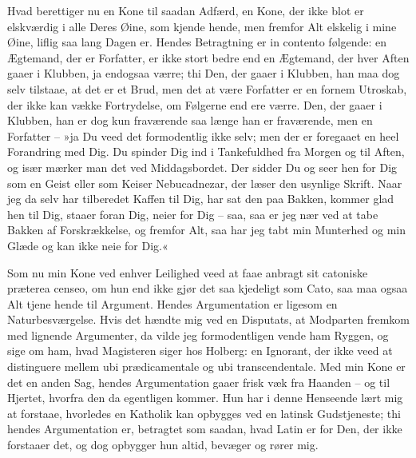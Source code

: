 \documentclass[12pt,a4paper]{article}
\begin{document}
Hvad berettiger nu en Kone til saadan Adfærd, en Kone, der ikke blot er elskværdig i alle Deres Øine, som kjende hende, men fremfor Alt elskelig i mine Øine, liflig saa lang Dagen er. Hendes Betragtning er in contento følgende: en Ægtemand, der er Forfatter, er ikke stort bedre end en Ægtemand, der hver Aften gaaer i Klubben, ja endogsaa værre; thi Den, der gaaer i Klubben, han maa dog selv tilstaae, at det er et Brud, men det at være Forfatter er en fornem Utroskab, der ikke kan vække Fortrydelse, om Følgerne end ere værre. Den, der gaaer i Klubben, han er dog kun fraværende saa længe han er fraværende, men en Forfatter – »ja Du veed det formodentlig ikke selv; men der er foregaaet en heel Forandring med Dig. Du spinder Dig ind i Tankefuldhed fra Morgen og til Aften, og især mærker man det ved Middagsbordet. Der sidder Du og seer hen for Dig som en Geist eller som Keiser Nebucadnezar, der læser den usynlige Skrift. Naar jeg da selv har tilberedet Kaffen til Dig, har sat den paa Bakken, kommer glad hen til Dig, staaer foran Dig, neier for Dig – saa, saa er jeg nær ved at tabe Bakken af Forskrækkelse, og fremfor Alt, saa har jeg tabt min Munterhed og min Glæde og kan ikke neie for Dig.«

Som nu min Kone ved enhver Leilighed veed at faae anbragt sit catoniske præterea censeo, om hun end ikke gjør det saa kjedeligt som Cato, saa maa ogsaa Alt tjene hende til Argument. Hendes Argumentation er ligesom en Naturbesværgelse. Hvis det hændte mig ved en Disputats, at Modparten fremkom med lignende Argumenter, da vilde jeg formodentligen vende ham Ryggen, og sige om ham, hvad Magisteren siger hos Holberg: en Ignorant, der ikke veed at distinguere mellem ubi prædicamentale og ubi transcendentale. Med min Kone er det en anden Sag, hendes Argumentation gaaer frisk væk fra Haanden – og til Hjertet, hvorfra den da egentligen kommer. Hun har i denne Henseende lært mig at forstaae, hvorledes en Katholik kan opbygges ved en latinsk Gudstjeneste; thi hendes Argumentation er, betragtet som saadan, hvad Latin er for Den, der ikke forstaaer det, og dog opbygger hun altid, bevæger og rører mig.
\end{document}
